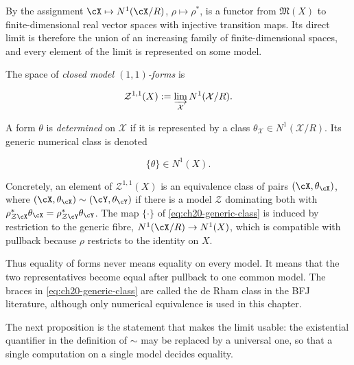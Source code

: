 By  the assignment
\(\cX\mapsto N^1(\cX/R)\), \(\rho\mapsto\rho^*\), is a functor from
\(\mathfrak M(X)\) to finite-dimensional real vector spaces with injective
transition maps.  Its direct limit is therefore the union of an increasing
family of finite-dimensional spaces, and every element of the limit is
represented on some model.

\begin{definition}
\label{def:ch20-closed-model-form}
The space of \emph{closed model \((1,1)\)-forms} is

\begin{equation}
\label{eq:ch20-model-forms}
 \mathcal Z^{1,1}(X)
   :=\varinjlim_{\mathcal X}N^1(\mathcal X/R).
\end{equation}

A form \(\theta\) is \emph{determined} on \(\mathcal X\) if it is represented
by a class \(\theta_{\mathcal X}\in N^1(\mathcal X/R)\).  Its generic
numerical class is denoted

\begin{equation}
\label{eq:ch20-generic-class}
                 \{\theta\}\in N^1(X).
\end{equation}
\end{definition}

Concretely, an element of \(\mathcal Z^{1,1}(X)\) is an equivalence class of pairs
\((\cX,\theta_{\cX})\), where \((\cX,\theta_{\cX})\sim(\cY,\theta_{\cY})\)
if there is a model \(\mathcal Z\) dominating both with
\(\rho_{\mathcal Z\cX}^*\theta_{\cX}=\rho_{\mathcal Z\cY}^*\theta_{\cY}\).  The map
\(\{\cdot\}\) of \eqref{eq:ch20-generic-class} is induced by restriction to
the generic fibre, \(N^1(\cX/R)\to N^1(X)\), which is compatible with
pullback because \(\rho\) restricts to the identity on \(X\).

Thus equality of forms never means equality on every model.  It means that
the two representatives become equal after pullback to one common model.
The braces in \eqref{eq:ch20-generic-class} are called the de Rham class in
the BFJ literature, although only numerical equivalence is used in this
chapter.

The next proposition is the statement that makes the limit usable: the
existential quantifier in the definition of \(\sim\) may be replaced by a
universal one, so that a single computation on a single model decides
equality.

